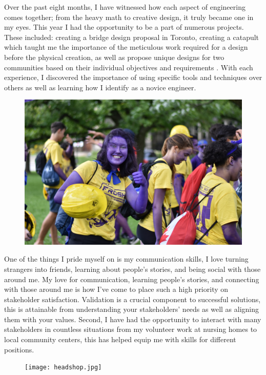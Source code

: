 \documentclass[paper=a4, fontsize=11pt]{article} %
\begin{document}
Over the past eight months, I have witnessed how each aspect of engineering comes together; from the heavy math to creative design, it truly became one in my eyes. This year I had the opportunity to be a part of numerous projects.  These included: creating a bridge design proposal in Toronto, creating a catapult which taught me the importance of the meticulous work required for a design before the physical creation, as well as propose unique designs for two communities based on their individual objectives \cite{objectives} and requirements \cite{requirements}. With each experience, I discovered the importance of using specific tools and techniques over others as well as learning how I identify as a novice engineer.

\begin{figure}[H]
    \centering
    \includegraphics[width=0.7\linewidth]{purple.jpg}
\end{figure}

One of the things I pride myself on is my communication skills, I love turning strangers into friends, learning about people's stories, and being social with those around me. My love for communication, learning people's stories, and connecting with those around me is how I've come to place such a high priority on stakeholder satisfaction. Validation \cite{validation} is a crucial component to successful solutions, this is attainable from understanding your stakeholders' needs as well as aligning them with your values. Second, I have had the opportunity to interact with many stakeholders in countless situations from my volunteer work at nursing homes to local community centers, this has helped equip me with skills for different positions.

\begin{figure}[H]
    \centering
    \texttt{[image: headshop.jpg]}
\end{figure}
\end{document}
